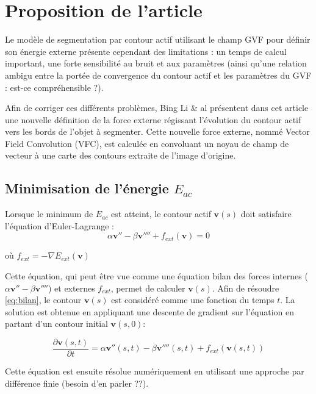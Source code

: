 \section{Proposition de l'article}

Le modèle de segmentation par contour actif utilisant le champ GVF pour définir son énergie externe présente cependant des limitations : un temps de calcul important, une forte sensibilité au bruit et aux paramètres (ainsi qu'une relation ambigu entre la portée de convergence du contour actif et les paramètres du GVF : est-ce compréhensible ?).

Afin de corriger ces différents problèmes, Bing Li \& al présentent dans cet article une nouvelle définition de la force externe régissant l'évolution du contour actif vers les bords  de l'objet à segmenter. Cette nouvelle force externe, nommé Vector Field Convolution (VFC), est calculée en convoluant un noyau de champ de vecteur à une carte des contours extraite de l'image d'origine.   

\subsection{Minimisation de l'énergie $E_{ac}$}

Lorsque le minimum de $E_{ac}$ est atteint, le contour actif $\mathbf{v}(s)$ doit satisfaire l'équation d'Euler-Lagrange :
\begin{equation}
	\alpha \mathbf{v}'' - \beta \mathbf{v}'''' + f_{ext}(\mathbf{v}) = 0
	\label{eq:bilan}
\end{equation}

où $f_{ext}= - \nabla E_{ext}(\mathbf{v})$

Cette équation, qui peut être vue comme une équation bilan des forces internes ($\alpha \mathbf{v}'' - \beta \mathbf{v}''''$) et externes $f_{ext}$, permet de calculer $\mathbf{v}(s)$. Afin de résoudre \ref{eq:bilan}, le contour $\mathbf{v}(s)$ est considéré comme une fonction du temps $t$. La solution est obtenue en appliquant une descente de gradient sur l'équation en partant d'un contour initial $\mathbf{v}(s,0)$:

\begin{equation}
	\frac{\partial \mathbf{v}(s,t)}{\partial t} = \alpha \mathbf{v}''(s,t) - \beta \mathbf{v}''''(s,t)+f_{ext}(\mathbf{v}(s,t))
	\label{eq:graddesc}
\end{equation}

Cette équation est ensuite résolue numériquement en utilisant une approche par différence finie (besoin d'en parler ??).

